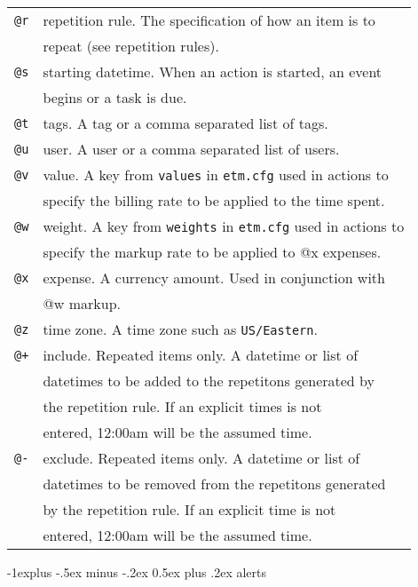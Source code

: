 \documentclass[9pt,landscape]{article}
\makeatletter
\renewcommand{\subsection}{\@startsection{subsection}{2}{0mm}%
                                {-1explus -.5ex minus -.2ex}%
                                {0.5ex plus .2ex}%
                                {\normalfont\normalsize\bfseries}}
\makeatother
\begin{document}
\begin{multicols}{3}
\begin{tabular}{@{}ll@{}}
\texttt{@r} & repetition rule. The specification of how an item is to \\
            & repeat (see repetition rules). \\
\texttt{@s} & starting datetime. When an action is started, an event \\
            & begins or a task is due. \\
\texttt{@t} & tags. A tag or a comma separated list of tags. \\
\texttt{@u} & user. A user or a comma separated list of users. \\
\texttt{@v} & value. A key from \texttt{values} in \texttt{etm.cfg} used in actions to \\
            & specify the billing rate to be applied to the time spent. \\
\texttt{@w} & weight. A key from \texttt{weights} in \texttt{etm.cfg} used in actions to \\
            & specify the markup rate to be applied to @x expenses. \\
\texttt{@x} & expense. A currency amount. Used in conjunction with \\
& @w markup.\\
\texttt{@z} & time zone. A time zone such as \texttt{US/Eastern}. \\
\texttt{@+} & include. Repeated items only. A datetime or list of \\
            & datetimes to be added to the repetitons generated by \\
            & the repetition rule. If an explicit times is not \\
            & entered, 12:00am will be the assumed time.\\
\texttt{@-} & exclude. Repeated items only. A datetime or list of \\
            & datetimes to be removed from the repetitons generated \\
            & by the repetition rule. If an explicit time is not \\
            & entered, 12:00am will be the assumed time. \\

\end{tabular}


\subsection{alerts}


\end{multicols}
\end{document}
